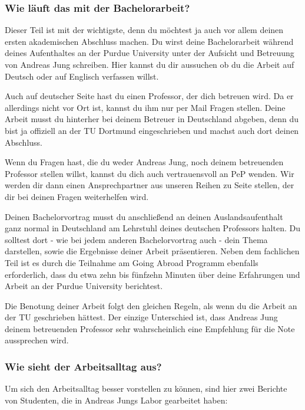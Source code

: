 \documentclass[
  paper=a4,
  fontsize=12pt,
  DIV=16,
  headheight=52pt,
  footheight=45pt,
  headinclude,
  parskip=full,
]{scrartcl}
\begin{document}
\subsubsection*{Wie läuft das mit der Bachelorarbeit?}
Dieser Teil ist mit der wichtigste, denn du möchtest ja auch vor allem deinen ersten akademischen Abschluss machen.
Du wirst deine Bachelorarbeit während deines Aufenthaltes an der Purdue University unter der Aufsicht und Betreuung von Andreas Jung schreiben.
Hier kannst du dir aussuchen ob du die Arbeit auf Deutsch oder auf Englisch verfassen willst.

Auch auf deutscher Seite hast du einen Professor, der dich betreuen wird.
Da er allerdings nicht vor Ort ist, kannst du ihm nur per Mail Fragen stellen.
Deine Arbeit musst du hinterher bei deinem Betreuer in Deutschland abgeben, denn du bist ja offiziell an der TU Dortmund eingeschrieben und machst auch dort deinen Abschluss.

Wenn du Fragen hast, die du weder Andreas Jung, noch deinem betreuenden Professor stellen willst, kannst du dich auch vertrauensvoll an PeP wenden.
Wir werden dir dann einen Ansprechpartner aus unseren Reihen zu Seite stellen,
der dir bei deinen Fragen weiterhelfen wird.

Deinen Bachelorvortrag musst du anschließend an deinen Auslandsaufenthalt ganz normal in Deutschland am Lehrstuhl deines deutschen Professors halten.
Du solltest dort - wie bei jedem anderen Bachelorvortrag auch - dein Thema
darstellen, sowie die Ergebnisse deiner Arbeit präsentieren.
Neben dem fachlichen Teil ist es durch die Teilnahme am Going Abroad Programm ebenfalls erforderlich, dass du etwa zehn bis fünfzehn Minuten über deine Erfahrungen und Arbeit an der Purdue University berichtest.

Die Benotung deiner Arbeit folgt den gleichen Regeln, als wenn du die Arbeit an der TU geschrieben hättest.
Der einzige Unterschied ist, dass Andreas Jung deinem betreuenden Professor sehr wahrscheinlich eine Empfehlung für die Note aussprechen wird.

\subsubsection*{Wie sieht der Arbeitsalltag aus?}
Um sich den Arbeitsalltag besser vorstellen zu können, sind hier zwei Berichte
von Studenten, die in Andreas Jungs Labor gearbeitet haben:
\end{document}
